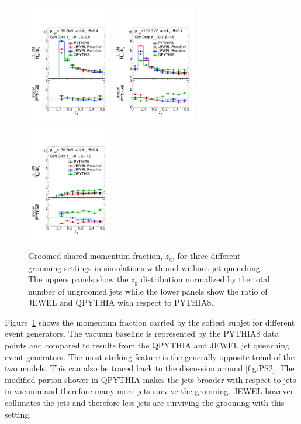 \begin{figure}[t]
\centering
\includegraphics[width=0.33\textwidth]{figures/SDGen/ZgCompModelsBeta00Z01.pdf}%
\includegraphics[width=0.33\textwidth]{figures/SDGen/ZgCompModelsBeta15Z05.pdf}%
\includegraphics[width=0.33\textwidth]{figures/SDGen/ZgCompModelsBetam1Z01.pdf}%
\caption{Groomed shared momentum fraction, $z_{\mathrm{g}}$, for three different grooming settings in simulations with and without jet quenching. The uppers panels show the $z_{\mathrm{g}}$ distribution normalized by the total number of ungroomed jets while the lower panels show the ratio of JEWEL and QPYTHIA with respect to PYTHIA8.}
\label{fig:SDGenZG}
\end{figure}
Figure~\ref{fig:SDGenZG} shows the momentum fraction carried by the softest subjet for different event generators. The vacuum baseline is represented by the PYTHIA8 data points and compared to results from the QPYTHIA and JEWEL jet quenching event generators. The most striking feature is the generally opposite trend of the two models. This can also be traced back to the discussion around \autoref{fig:PS2}. The modified parton shower in QPYTHIA makes the jets broader with respect to jets in vacuum and therefore many more jets survive the grooming. JEWEL however collimates the jets and therefore less jets are surviving the grooming with this setting.

